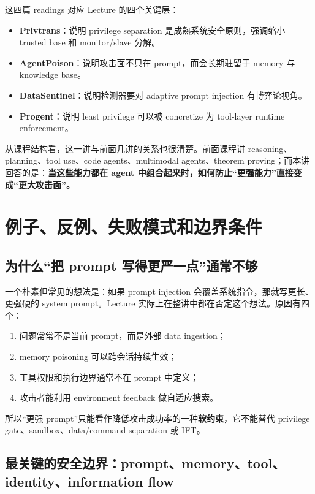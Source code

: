 \documentclass[a4paper]{article}
\begin{document}
这四篇 readings 对应 Lecture 的四个关键层：

\begin{itemize}
\item \textbf{Privtrans}：说明 privilege separation 是成熟系统安全原则，强调缩小 trusted base 和 monitor/slave 分解。
\item \textbf{AgentPoison}：说明攻击面不只在 prompt，而会长期驻留于 memory 与 knowledge base。
\item \textbf{DataSentinel}：说明检测器要对 adaptive prompt injection 有博弈论视角。
\item \textbf{Progent}：说明 least privilege 可以被 concretize 为 tool-layer runtime enforcement。
\end{itemize}

从课程结构看，这一讲与前面几讲的关系也很清楚。前面课程讲 reasoning、planning、tool use、code agents、multimodal agents、theorem proving；而本讲回答的是：\textbf{当这些能力都在 agent 中组合起来时，如何防止“更强能力”直接变成“更大攻击面”。}

\section{例子、反例、失败模式和边界条件}

\subsection{为什么“把 prompt 写得更严一点”通常不够}

一个朴素但常见的想法是：如果 prompt injection 会覆盖系统指令，那就写更长、更强硬的 system prompt。Lecture 实际上在整讲中都在否定这个想法。原因有四个：

\begin{enumerate}
\item 问题常常不是当前 prompt，而是外部 data ingestion；
\item memory poisoning 可以跨会话持续生效；
\item 工具权限和执行边界通常不在 prompt 中定义；
\item 攻击者能利用 environment feedback 做自适应搜索。
\end{enumerate}

所以“更强 prompt”只能看作降低攻击成功率的一种\textbf{软约束}，它不能替代 privilege gate、sandbox、data/command separation 或 IFT。

\subsection{最关键的安全边界：prompt、memory、tool、identity、information flow}
\end{document}

